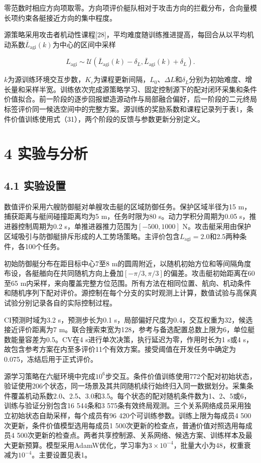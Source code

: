 \documentclass[UTF8,a4paper,zihao=5,fontset=none]{ctexart}
\begin{document}
零范数时相应方向项取零。方向项评价艇队相对于攻击方向的拦截分布，合向量模长项约束各艇接近方向的集中程度。

源策略采用攻击者机动性课程{[}28{]}，平均难度随训练推进提高，每回合从以平均机动系数\(\bar L_{\mathrm{agi}}(k)\)为中心的区间中采样

\[
L_{\mathrm{agi}}\sim\mathcal U\!\left(
\bar L_{\mathrm{agi}}(k)-\delta_L,
\bar L_{\mathrm{agi}}(k)+\delta_L\right).
\tag{37}
\]

\(k\)为源训练环境交互步数，\(K_c\)为课程更新间隔，\(L_0\)、\(\Delta L\)和\(\delta_L\)分别为初始难度、增长量和采样半宽。训练依次完成源策略学习、固定控制源下的配对闭环采集和条件价值拟合。前一阶段的逐步回报塑造源动作与局部融合偏好，后一阶段的二元终局标签评价同一候选空间中的完整方案。源训练的奖励系数和课程记录列于表1，条件价值训练使用式（31），两个阶段的反馈与参数更新分别定义。

\FloatBarrier\section*{4 实验与分析}

\subsection*{4.1 实验设置}

数值评价采用六艘防御艇对单艘攻击艇的区域防御任务。保护区域半径为15
m，捕获距离与艇间碰撞距离均为5 m，任务时限为80 s。动力学积分周期为0.05
s，推进器控制周期为0.2 s，单推进器推力范围为\([-500,1000]\)
N。攻击艇采用由保护区域吸引与防御艇排斥形成的人工势场策略。主评价包含\(L_{\mathrm{agi}}=2.0\)和2.5两种条件，各100个任务。

初始防御艇分布在距目标中心7至8
m的圆周附近，以随机初始方位和等间隔角度布设，各艇艏向在共同随机方向上叠加\([-\pi/3,\pi/3]\)的偏差。攻击艇初始距离在60至65
m内采样，来向覆盖完整方位范围。所有方法在相同位置、航向、机动条件和随机序列下配对评价。源控制在每个分支的实时观测上计算，数值试验与高保真试验分别记录各自的实际控制过程。

CI预测时域为3.2 s，预测步长为0.1
s，局部偏好尺度为0.4，交互权重为32，候选接近评价距离为7
m。联合搜索束宽为128，参考与备选配置总数上限为6，单位艇数能量容差为0.5。CV在4
s进行单次决策，执行延迟为零，作用时长为1 s或4
s，故包含参考方案在内至多评价11个有效方案。接受阈值在开发任务中确定为0.075，冻结后用于正式评价。

源学习策略在六艇环境中完成\(10^6\)步交互。条件价值训练使用772个配对初始状态，验证使用206个状态，同一场景及其共同随机续行始终归入同一数据划分。采集条件覆盖机动系数2.0、2.5、3.0和3.5。每个状态的配对随机条件数为1、2、5或6，训练与验证分别包含16
544条和3
575条有效终局观测。三个关系网络成员采用独立初始状态自助采样，每个成员有96
420个可训练参数。训练上限为每成员4 500次更新，条件价值模型选用每成员1
500次更新的检查点，普通价值对照选用每成员4
500次更新的检查点。两者共享控制源、关系网络、候选方案、训练样本及最大更新预算。模型采用AdamW优化，学习率为\(3\times10^{-4}\)，批量大小为48，权重衰减为\(10^{-4}\)。主要设置见表1。
\end{document}
